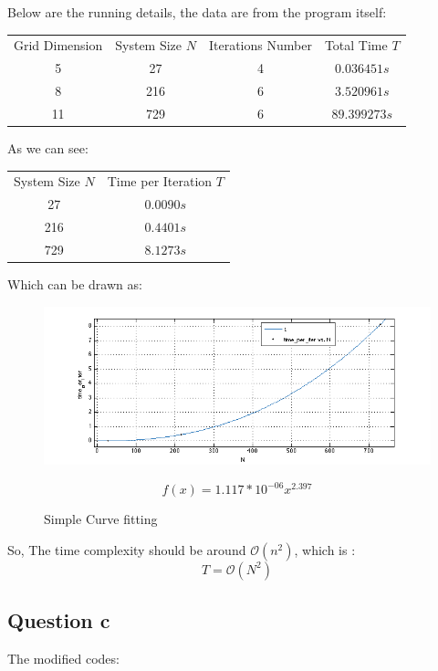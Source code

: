 \documentclass[11pt]{article}
\begin{document}
    Below are the running details, the data are from the program itself:
    \begin{center}
    \begin{tabular}{c c c c}
    Grid Dimension & System Size $N$& Iterations Number & Total Time $T$\\
    5 & 27 & 4 & $0.036451s$\\
    8 & 216 & 6 & $3.520961s$\\
    11 & 729 & 6 & $89.399273s$
    \end{tabular}
    \end{center}
    As we can see:
    \begin{center}
    \begin{tabular}{c c}
    System Size $N$& Time per Iteration $T$\\
    27& $ 0.0090s$\\
    216& $0.4401s$\\
    729 &$8.1273s$
    \end{tabular}
    \end{center}
    \FloatBarrier
    Which can be drawn as: 
    \begin{figure}
    \centering
\includegraphics[scale=0.6]{Time_complexity.png}
    \caption{Simple Curve fitting}
    \begin{minipage}{0.75\textwidth}
    {\footnotesize $$f(x) = 1.117*10^{-06}x^{2.397}$$}
    \end{minipage}
    \end{figure}
    \FloatBarrier
So, The time complexity should be around $\mathcal{O}(n^2)$, which is :
$$T = \mathcal{O}(N^2)$$

\subsection{Question c}
The modified codes:
\end{document}
